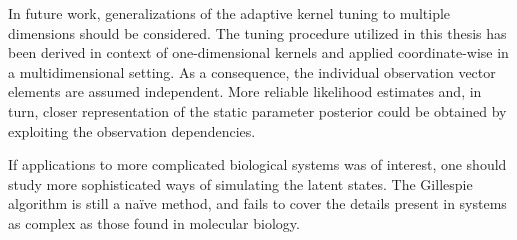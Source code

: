 In future work, generalizations of the adaptive kernel tuning to multiple dimensions should be considered. The tuning procedure utilized in this thesis has been derived in context of one-dimensional kernels and applied coordinate-wise in a multidimensional setting. As a consequence, the individual observation vector elements are assumed independent. More reliable likelihood estimates and, in turn, closer representation of the static parameter posterior could be obtained by exploiting the observation dependencies.

If applications to more complicated biological systems was of interest, one should study more sophisticated ways of simulating the latent states. The Gillespie algorithm is still a naïve method, and fails to cover the details present in systems as complex as those found in molecular biology.